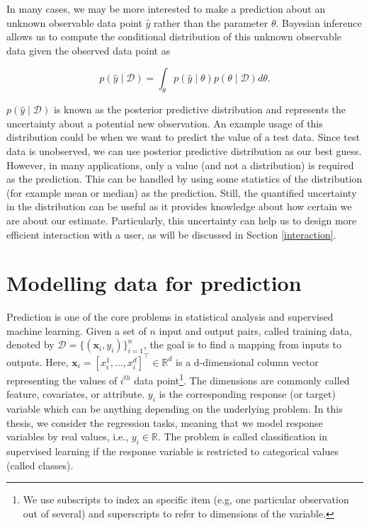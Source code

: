 \documentclass[dissertation,math,vertlayout,pdfa,colorlinks]{aaltoseries}
\newcommand{\bD}{\mathcal{D}}
\newcommand{\tp}{^{\top}}
\begin{document}
In many cases, we may be more interested to make a prediction about an unknown observable data point $\hat{y}$ rather than the parameter $\theta$. Bayesian inference  allows us to compute the conditional distribution of this unknown observable data given the observed data point as 

\begin{equation}
p(\hat{y} \mid\bD ) = \int_{\theta} p(\hat{y}  \mid \theta)p(\theta \mid \bD)d\theta. 
\end{equation}

$p(\hat{y} \mid \bD)$ is known as the posterior predictive distribution and represents the uncertainty about a potential new observation. An example usage of this distribution could be when we want to predict the value of a test data. Since test data is unobserved, we can use posterior predictive distribution as our best guess. However, in many applications, only a value (and not a distribution) is required as the prediction. This can be handled by using some statistics of the distribution (for example mean or median) as the prediction. Still, the quantified uncertainty in the distribution can be useful as it provides knowledge about how certain we are about our estimate. Particularly, this uncertainty can help us to design more efficient interaction with a user, as will be discussed in Section \ref{interaction}.

	


\section{Modelling data for prediction} \label{prob_model_data}

Prediction is one of the core problems in statistical analysis and supervised machine learning. Given a set of $n$ input and output pairs, called training data, denoted by $\bD= \{(\bm{x}_i,y_i)\}_{i=1}^{n}$, the goal is to find a mapping from inputs to outputs. Here, $\bm{x}_i = [x_i^1,\ldots,x_i^d]\tp \in \mathbb{R}^d$ is a d-dimensional column vector representing the values of $i^{th}$ data point\footnote{We use subscripts to index an specific item (e.g, one particular observation out of several) and superscripts to refer to dimensions of the variable.}. The dimensions are commonly called feature, covariates, or attribute. $y_i$ is the corresponding response (or target) variable which can be anything depending on the underlying problem. In this thesis, we consider the regression tasks, meaning that we model response variables by real values, i.e., $y_i \in \mathbb{R}$. The problem is called classification in supervised learning if the response variable is restricted to categorical values (called classes). 
\end{document}
